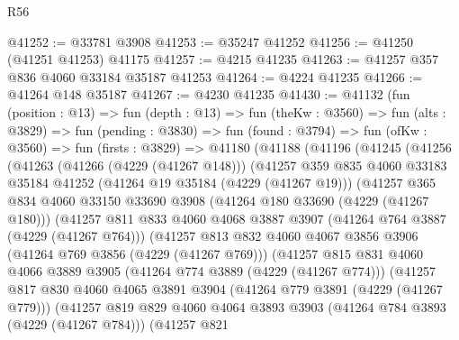 \begin{lexlean}{R56}
\begin{coremodule}
@41252 := @33781 @3908
@41253 := @35247 @41252
@41256 := @41250 (@41251 @41253) @41175
@41257 := @4215 @41235
@41263 := @41257 @357 @836 @4060 @33184 @35187 @41253
@41264 := @4224 @41235
@41266 := @41264 @148 @35187
@41267 := @4230 @41235
@41430 := @41132
    (fun (position : @13) =>
    fun (depth : @13) =>
    fun (theKw : @3560) =>
    fun (alts : @3829) =>
    fun (pending : @3830) =>
    fun (found : @3794) =>
    fun (ofKw : @3560) =>
    fun (firsts : @3829) =>
    @41180
      (@41188
        (@41196
          (@41245
            (@41256
              (@41263
                (@41266 (@4229 (@41267 @148)))
                (@41257
                  @359
                  @835
                  @4060
                  @33183
                  @35184
                  @41252
                  (@41264 @19 @35184 (@4229 (@41267 @19)))
                  (@41257
                    @365
                    @834
                    @4060
                    @33150
                    @33690
                    @3908
                    (@41264 @180 @33690 (@4229 (@41267 @180)))
                    (@41257
                      @811
                      @833
                      @4060
                      @4068
                      @3887
                      @3907
                      (@41264 @764 @3887 (@4229 (@41267 @764)))
                      (@41257
                        @813
                        @832
                        @4060
                        @4067
                        @3856
                        @3906
                        (@41264 @769 @3856 (@4229 (@41267 @769)))
                        (@41257
                          @815
                          @831
                          @4060
                          @4066
                          @3889
                          @3905
                          (@41264 @774 @3889 (@4229 (@41267 @774)))
                          (@41257
                            @817
                            @830
                            @4060
                            @4065
                            @3891
                            @3904
                            (@41264 @779 @3891 (@4229 (@41267 @779)))
                            (@41257
                              @819
                              @829
                              @4060
                              @4064
                              @3893
                              @3903
                              (@41264 @784 @3893 (@4229 (@41267 @784)))
                              (@41257
                                @821

\end{coremodule}
\end{lexlean}
